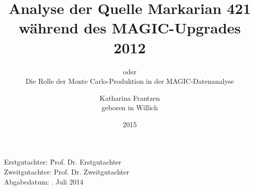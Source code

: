 








\newcommand{\thetitle}{Analyse der Quelle Markarian 421\\ während des MAGIC-Upgrades 2012}
\newcommand{\thesubtitle}{oder\\ Die Rolle der Monte Carlo-Produktion in der MAGIC-Datenanalyse}
\newcommand{\Geburtsort}{Willich}
\newcommand{\Jahr}{2015}
\newcommand{\Lehrstuhl}{Experimentelle Physik V}
\newcommand{\Betreuer}{Prof. Dr. Erstgutachter}
\newcommand{\Zweitgutachter}{Prof. Dr. Zweitgutachter}
\newcommand{\Abgabedatum}{11. Juli 2014}

\author{
   Katharina Frantzen\\
   geboren in \Geburtsort
}

\titlehead{
   \texttt{[image: logos/tu-logo.pdf]}
}
\title{\thetitle}
\subtitle{\thesubtitle}

\date{\Jahr}

\subject{Arbeit zur Erlangung des akademischen Grades eines \\Doktors der Naturwissenschaften \\(Dr. rer. nat.)}
\publishers{Lehrstuhl für \Lehrstuhl \\ Fakultät Physik \\ Technische Universität Dortmund}



\frontmatter
\maketitle
\thispagestyle{empty}
\vspace*{\fill}
\begin{tabbing}
   Erstgutachter: \hspace{3em}\=   \Betreuer \\ 
   Zweitgutachter: \> \Zweitgutachter\\
   Abgabedatum: \>\Abgabedatum
\end{tabbing}
\newpage

